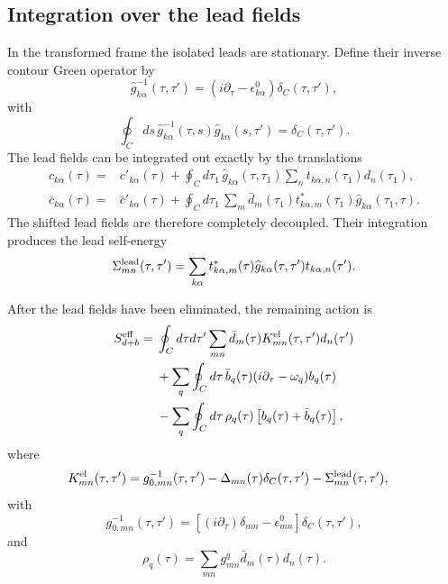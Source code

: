 \documentclass[
 reprint,
 superscriptaddress,
 amsmath,amssymb,
 aps,prb,
 longbibliography,
 floatfix
]{revtex4-2}
\begin{document}
\subsection{Integration over the lead fields}
\label{subsec:pf-integrate-leads}

In the transformed frame the isolated leads are stationary. Define their inverse contour Green operator by
\begin{equation*}
\widehat g_{k\alpha}^{-1}(\tau,\tau')
=
\left(
i\partial_\tau-\epsilon_{k\alpha}^{0}
\right)
\delta_C(\tau,\tau'),
\end{equation*}
with
\begin{equation*}
\oint_C ds\,
\widehat g_{k\alpha}^{-1}(\tau,s)
\widehat g_{k\alpha}(s,\tau')
=
\delta_C(\tau,\tau').
\end{equation*}
The lead fields can be integrated out exactly by the translations
\begin{align*}
c_{k\alpha}(\tau)
={}&
c'_{k\alpha}(\tau)
+
\oint_C d\tau_1\,
\widehat g_{k\alpha}(\tau,\tau_1)
\sum_n
t_{k\alpha,n}(\tau_1)d_n(\tau_1),
\\
\bar c_{k\alpha}(\tau)
={}&
\bar c'_{k\alpha}(\tau)
+
\oint_C d\tau_1\,
\sum_m
\bar d_m(\tau_1)t_{k\alpha,m}^{*}(\tau_1)
\widehat g_{k\alpha}(\tau_1,\tau).
\end{align*}
The shifted lead fields are therefore completely decoupled. Their integration produces the lead self-energy
\begin{equation*}
\Sigma_{mn}^{\rm lead}(\tau,\tau')
=
\sum_{k\alpha}
t_{k\alpha,m}^{*}(\tau)
\widehat g_{k\alpha}(\tau,\tau')
t_{k\alpha,n}(\tau').
\end{equation*}

After the lead fields have been eliminated, the remaining action is
\begin{align*}
S_{d+b}^{\rm eff}
={}&
\oint_C d\tau d\tau'
\sum_{mn}
\bar d_m(\tau)
K_{mn}^{\rm el}(\tau,\tau')
d_n(\tau')
\\
&+
\sum_q
\oint_C d\tau\,
\bar b_q(\tau)
(i\partial_\tau-\omega_q)
b_q(\tau)
\\
&-
\sum_q
\oint_C d\tau\,
\rho_q(\tau)
\left[
b_q(\tau)+\bar b_q(\tau)
\right],
\end{align*}
where
\begin{align*}
K_{mn}^{\rm el}(\tau,\tau')
={}&
g_{0,mn}^{-1}(\tau,\tau')
-\Delta_{mn}(\tau)\delta_C(\tau,\tau')
-
\Sigma_{mn}^{\rm lead}(\tau,\tau'),
\end{align*}
with
\begin{equation*}
g_{0,mn}^{-1}(\tau,\tau')
=
\left[
(i\partial_\tau)\delta_{mn}
-\epsilon_{mn}^{0}
\right]
\delta_C(\tau,\tau'),
\end{equation*}
and
\begin{equation*}
\rho_q(\tau)
=
\sum_{mn}
g_{mn}^{q}
\bar d_m(\tau)d_n(\tau).
\end{equation*}
\end{document}
